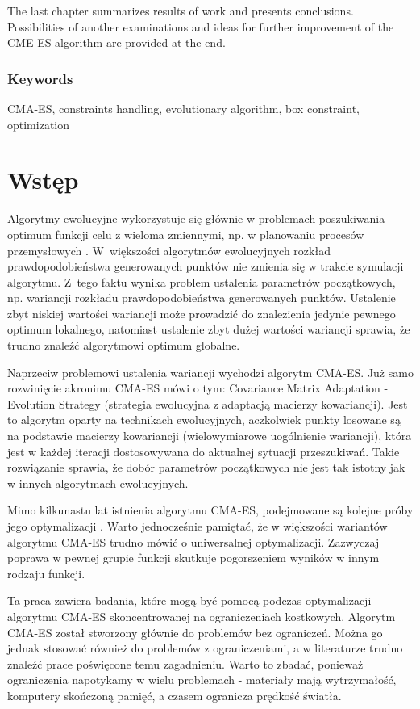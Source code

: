 \documentclass{mini}
\begin{document}
The last chapter summarizes results of work and presents conclusions. Possibilities of another examinations and ideas for further improvement of the CME-ES algorithm are provided at the end.

\subsubsection*{Keywords}
CMA-ES, constraints handling, evolutionary algorithm, box constraint, optimization

\pagebreak

\section{Wstęp}
\hspace{3,4ex}Algorytmy ewolucyjne wykorzystuje się głównie w problemach poszukiwania optimum funkcji celu z wieloma zmiennymi, np. w planowaniu procesów przemysłowych \cite{zast}. W~większości algorytmów ewolucyjnych rozkład prawdopodobieństwa generowanych punktów nie zmienia się w trakcie symulacji algorytmu. Z~tego faktu wynika problem ustalenia parametrów początkowych, np. wariancji rozkładu prawdopodobieństwa generowanych punktów. Ustalenie zbyt niskiej wartości wariancji może prowadzić do znalezienia jedynie pewnego optimum lokalnego, natomiast ustalenie zbyt dużej wartości wariancji sprawia, że trudno znaleźć algorytmowi optimum globalne.

Naprzeciw problemowi ustalenia wariancji wychodzi algorytm CMA-ES. Już samo rozwinięcie akronimu CMA-ES mówi o tym: Covariance Matrix Adaptation - Evolution Strategy (strategia ewolucyjna z adaptacją macierzy kowariancji). Jest to algorytm oparty na technikach ewolucyjnych, aczkolwiek punkty losowane są na podstawie macierzy kowariancji (wielowymiarowe uogólnienie wariancji), która jest w każdej iteracji dostosowywana do aktualnej sytuacji przeszukiwań. Takie rozwiązanie sprawia, że dobór parametrów początkowych nie jest tak istotny jak w innych algorytmach ewolucyjnych.

Mimo kilkunastu lat istnienia algorytmu CMA-ES, podejmowane są kolejne próby jego optymalizacji \cite{magist} \cite{lcmaes}. Warto jednocześnie pamiętać, że w większości wariantów algorytmu CMA-ES trudno mówić o uniwersalnej optymalizacji. Zazwyczaj poprawa w pewnej grupie funkcji skutkuje pogorszeniem wyników w innym rodzaju funkcji.

Ta praca zawiera badania, które mogą być pomocą podczas optymalizacji algorytmu CMA-ES skoncentrowanej na ograniczeniach kostkowych. Algorytm CMA-ES został stworzony głównie do problemów bez ograniczeń. Można go jednak stosować również do problemów z ograniczeniami, a w literaturze trudno znaleźć prace poświęcone temu zagadnieniu. Warto to zbadać, ponieważ ograniczenia napotykamy w wielu problemach - materiały mają wytrzymałość, komputery skończoną pamięć, a czasem ogranicza prędkość światła.
\end{document}
